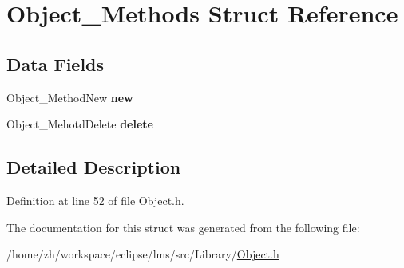 \hypertarget{structObject__Methods}{\section{Object\-\_\-\-Methods Struct Reference}
\label{structObject__Methods}
}
\subsection*{Data Fields}
\begin{DoxyCompactItemize}
\item 
\hypertarget{structObject__Methods_acc4a57874df85abacd1fe5bebd273cb1}{Object\-\_\-\-Method\-New {\bfseries new}}\label{structObject__Methods_acc4a57874df85abacd1fe5bebd273cb1}

\item 
\hypertarget{structObject__Methods_acb48de5cbd030bd856e8448fec37b077}{Object\-\_\-\-Mehotd\-Delete {\bfseries delete}}\label{structObject__Methods_acb48de5cbd030bd856e8448fec37b077}

\end{DoxyCompactItemize}


\subsection{Detailed Description}


Definition at line 52 of file Object.\-h.



The documentation for this struct was generated from the following file\-:\begin{DoxyCompactItemize}
\item 
/home/zh/workspace/eclipse/lms/src/\-Library/\hyperlink{Object_8h}{Object.\-h}\end{DoxyCompactItemize}
